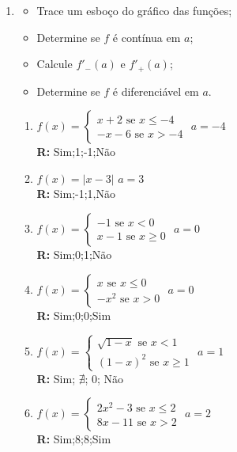 \documentclass[oneside,a4paper,12pt]{article}
\begin{document}
\begin{enumerate}
	\item \begin{itemize}
		\item Trace um esboço do gráfico das funções;
		\item Determine se $f$ é contínua em $a$;
		\item Calcule $f'_{-}(a)$ e $f'_{+}(a)$;
		\item Determine se $f$ é diferenciável em $a$.
	\end{itemize}
	\begin{enumerate}
		\item $f(x) = \begin{cases}
		x+2 \text{ se } x \leq -4 \\
		-x -6 \text{ se } x > -4
		\end{cases}$
		$a = -4$		\\ {\bf R:} Sim;1;-1;Não
		\item $f(x) = |x-3|$ $a = 3$ \\ {\bf R:} Sim;-1;1,Não
		\item $f(x) = \begin{cases}
		-1 \text{ se } x < 0 \\
		x-1 \text{ se } x \geq 0
		\end{cases}$
		$a = 0$ \\ {\bf R:} Sim;0;1;Não
		\item $f(x) = \begin{cases}
		x \text{ se } x \leq 0 \\
		-x^2 \text{ se } x > 0
		\end{cases}$
		$a = 0$ \\ {\bf R:} Sim;0;0;Sim
		\item $f(x) = \begin{cases}
		\sqrt{1-x} \text{ se } x < 1 \\
		(1-x)^2 \text{ se } x \geq 1
		\end{cases}$
		$a = 1$ \\ {\bf R:} Sim; $\nexists$; 0; Não
		\item $f(x) = \begin{cases}
		2x^2 - 3 \text{ se } x \leq 2 \\
		8x - 11 \text{ se } x > 2
		\end{cases}$
		$a = 2$ \\ {\bf R:} Sim;8;8;Sim
	\end{enumerate}
	

\end{enumerate}
\end{document}
